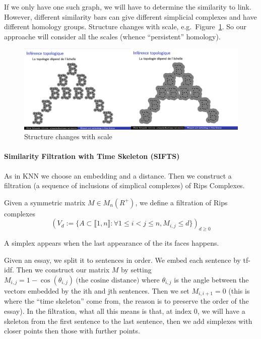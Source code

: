 If we only have one such graph, we will have to determine the similarity to link.
However, different similarity bars can give different simplicial complexes and have
different homology groups. Structure changes with scale, e.g.\ Figure~\ref{fig:scale}.
So our approache will consider all the scales (whence ``persistent'' homology).

\begin{figure}[H]
\centering
\includegraphics[width=14cm]{scale.png}
\caption{Structure changes with scale}
\label{fig:scale}
\end{figure}

\paragraph{Similarity Filtration with Time Skeleton (SIFTS) \cite{Zhu_2013}}

As in KNN we choose an embedding and a
distance. Then we construct a filtration (a sequence of inclusions
of simplical complexes) of Rips Complexes.

\begin{definition}
  Given a symmetric matrix $M \in M_n(R^+)$, we define a filtration of Rips complexes
  $$
  (V_d := \{A \subset \llbracket 1, n\rrbracket :
  \forall 1\le i<j\le n, M_{i, j} \le d\})_{d\ge 0}
  $$
\end{definition}
\RM A simplex appears when the last appearance of the its faces happens.

Given an essay, we split it to sentences in order. We embed each sentence by tf-idf.
Then we construct our matrix $M$ by setting $M_{i, j} = 1-\cos(\theta_{i,j})~\text{(the cosine distance)}$
where $\theta_{i, j}$ is the angle between the vectors embedded by the ith and jth sentences.
Then we set $M_{i, i+1} = 0$ (this is where the ``time skeleton'' come from, the reason is
to preserve the order of the essay). In the filtration, what all this means is that,
at index 0, we will have a skeleton from the first sentence to the last sentence,
then we add simplexes with closer points then those with further points.


